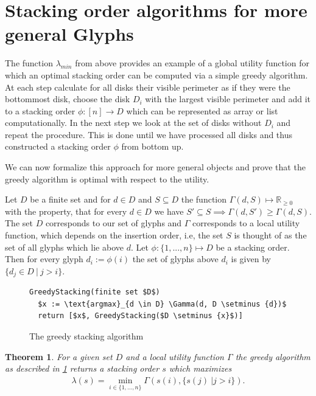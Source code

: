 \documentclass[a4paper,11pt]{article}
\newtheorem{theorem}{Theorem}
\begin{document}
\section{Stacking order algorithms for more general Glyphs}

The function $\lambda_{min}$ from above provides an example of a global utility function for which an optimal stacking order can be computed via a simple greedy algorithm. At each step calculate for all disks their visible perimeter as if they were the bottommost disk, choose the disk $D_i$ with the largest visible perimeter and add it to a stacking order $\phi: [n]\rightarrow D$ which can be represented as array or list computationally. In the next step we look at the set of disks without $D_i$ and repeat the procedure. This is done until we have processed all disks and thus constructed a stacking order $\phi$ from bottom up.

We can now formalize this approach for more general objects and prove that the greedy algorithm is optimal with respect to the utility.

Let $D$ be a finite set and for $d \in D$ and $S \subseteq D$ the function $ \Gamma(d, S) \mapsto \mathbb{R}_{\geq 0} $ with the property, that for every $d \in D$ we have $S' \subseteq S \implies \Gamma(d, S') \geq \Gamma(d, S)$. \\

The set $D$ corresponds to our set of glyphs and $\Gamma$ corresponds to a local utility function, which depends on the insertion order, i.e, the set $S$ is thought of as the set of all glyphs which lie above $d$. Let $\phi: \{1,...,n\} \mapsto D$ be a stacking order. Then for every glyph $d_i:=\phi(i)$ the set of glyphs above $d_i$ is given by $\{d_j\in D\ |\ j > i\}$.

\begin{figure}[H]
  \begin{lstlisting}[mathescape=true]
GreedyStacking(finite set $D$)
  $x := \text{argmax}_{d \in D} \Gamma(d, D \setminus {d})$
  return [$x$, GreedyStacking($D \setminus {x}$)]
  \end{lstlisting}
  \caption{The greedy stacking algorithm}
  \label{fig:greedyalg}
\end{figure}


\begin{theorem}
  For a given set $D$ and a local utility function $\Gamma$ the greedy algorithm as described in \ref{fig:greedyalg} returns a stacking order $s$ which maximizes
  \begin{align*}
    \lambda(s) = \min_{i \in \{1,\dots,n\}} \Gamma(s(i), \{s(j)\ | j > i\}).
  \end{align*}
\end{theorem}
\end{document}
